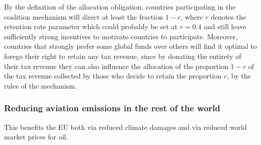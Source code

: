 By the definition of the allocation obligation, countries participating in the coalition mechanism will direct at least the fraction $1-r$, where $r$ denotes the retention rate parameter which could probably be set at $r=0.4$ and still leave sufficiently strong incentives to motivate countries to participate. Moreover, countries that strongly prefer some global funds over others will find it optimal to forego their right to retain any tax revenue, since by donating the entirety of their tax revenue they can also influence the allocation of the proportion $1-r$ of the tax revenue collected by those who decide to retain the proportion $r$, by the rules of the mechanism.

\subsubsection{Reducing aviation emissions in the rest of the world}

This benefits the EU both via reduced climate damages and via reduced world market prices for oil.



